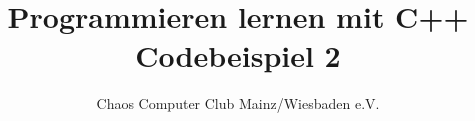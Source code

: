 


	\title{Programmieren lernen mit C++\\Codebeispiel 2}
	\author{Chaos Computer Club Mainz/Wiesbaden e.V.}
	\maketitle
	
	\section*{}
	
	\lstset{numbers=left}
	
	
